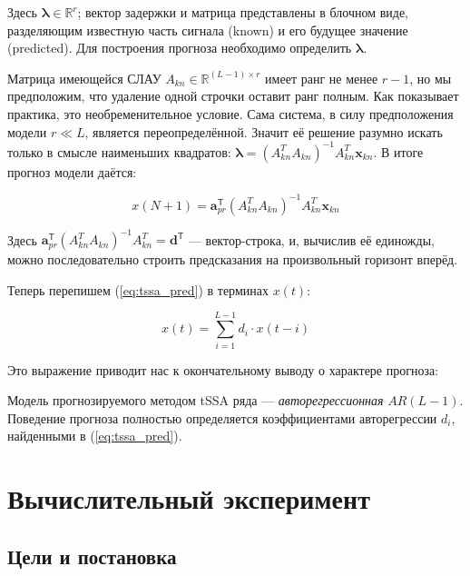 	    	Здесь $ \boldsymbol{\lambda} \in \mathbb{R}^r $; вектор задержки и матрица представлены в блочном виде, разделяющим известную часть сигнала (known) и его будущее значение (predicted). Для построения прогноза необходимо определить $ \boldsymbol{\lambda} $. 
	    	
	    	Матрица имеющейся СЛАУ $ A_{kn} \in \mathbb{R}^{(L - 1) \times r} $ имеет ранг не менее $ r - 1 $, но мы предположим, что удаление одной строчки оставит ранг полным. Как показывает практика, это необременительное условие. Сама система, в силу предположения модели $ r \ll L $, является переопределённой. Значит её решение разумно искать только в смысле наименьших квадратов: $ \boldsymbol{\lambda} = (A_{kn}^T A_{kn})^{-1} A_{kn}^T \mathbf{x}_{kn} $. В итоге прогноз модели даётся:
	    	
	    	\begin{equation}\label{eq:tssa_pred}
	    		x(N + 1) = \mathbf{a}_{pr}^{\mathsf{T}} (A_{kn}^T A_{kn})^{-1} A_{kn}^T \mathbf{x}_{kn}
	    	\end{equation}
	    
	    	 Здесь $ \mathbf{a}_{pr}^{\mathsf{T}} (A_{kn}^T A_{kn})^{-1} A_{kn}^T = \mathbf{d}^{\mathsf{T}} $ --- вектор-строка, и, вычислив её единожды, можно последовательно строить предсказания на произвольный горизонт вперёд.
	    	 
	    	 Теперь перепишем (\ref{eq:tssa_pred}) в терминах $ x(t) $:
	    	 
	    	 \begin{equation*}\label{eq:autoregr}
	    	 	x(t) = \sum\limits_{i = 1}^{L - 1} d_i \cdot x(t - i)
	    	 \end{equation*}
	    	 
	    	 Это выражение приводит нас к окончательному выводу о характере прогноза:
	    	 
	    	 \begin{Th}
	    	 	Модель прогнозируемого методом tSSA ряда --- \textit{авторегрессионная} $ AR(L - 1) $. Поведение прогноза полностью определяется коэффициентами авторегрессии $ d_i $, найденными в (\ref{eq:tssa_pred}).
	    	 \end{Th}
	    
	\section{Вычислительный эксперимент}	
	
		\subsection{Цели и постановка}
	
